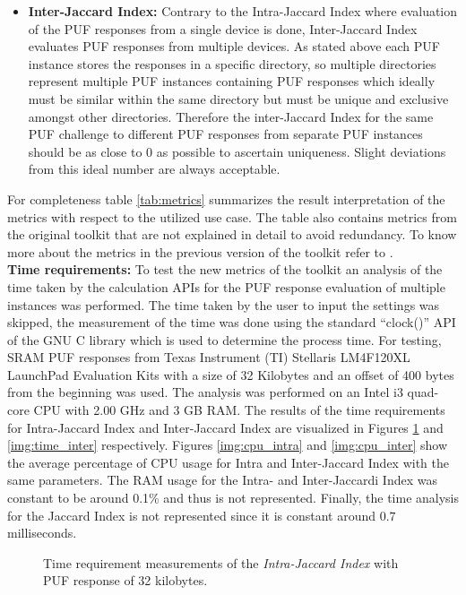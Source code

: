 \begin{itemize}
	\item \textbf{Inter-Jaccard Index:} Contrary to the Intra-Jaccard Index where evaluation of the PUF responses from a single device is done, Inter-Jaccard Index evaluates PUF responses from multiple devices. As stated above each PUF instance stores the responses in a specific directory, so multiple directories represent multiple PUF instances containing PUF responses which ideally must be similar within the same directory but must be unique and exclusive amongst other directories.
		Therefore the inter-Jaccard Index for the same PUF challenge to different PUF responses from
		separate PUF instances should be as close to $0$ as possible to ascertain
		uniqueness. Slight deviations from this ideal number are always acceptable.
\end{itemize}

For completeness table \ref{tab:metrics} summarizes the result interpretation of the metrics with respect to the utilized use case. The table also contains metrics from the original toolkit that are not explained in detail to avoid redundancy. To know more about the metrics in the previous version of the toolkit refer to \cite{71}.\\

\textbf{Time requirements:} To test the new metrics of the toolkit an analysis of the time taken by the calculation APIs for the PUF response evaluation of multiple instances was performed. The time taken by the user to input the settings was skipped, the measurement of the time was done using the standard ``clock()'' API of the GNU C library which is used to determine the process time. For testing, SRAM PUF responses from Texas Instrument (TI) Stellaris LM4F120XL LaunchPad Evaluation Kits with a
size of 32 Kilobytes and an offset of 400 bytes from the beginning was used. The analysis was performed on an Intel i3 quad-core CPU with 2.00 GHz and 3 GB RAM. The results of the time requirements for Intra-Jaccard Index and Inter-Jaccard Index are visualized in Figures \ref{img:time_intra} and \ref{img:time_inter} respectively. Figures \ref{img:cpu_intra} and \ref{img:cpu_inter} show the average percentage of CPU usage for Intra and Inter-Jaccard Index with the same parameters. The
RAM usage for the Intra- and Inter-Jaccardi Index was constant to be around 0.1\% and thus is not represented. Finally, the time analysis for the Jaccard Index is not represented since it is constant around $0.7$ milliseconds.

\begin{figure}[t!]
\centering
{}
\caption{Time requirement measurements of the \emph{Intra-Jaccard Index} with PUF response of 32 kilobytes.}
\label{img:time_intra}
\end{figure}


